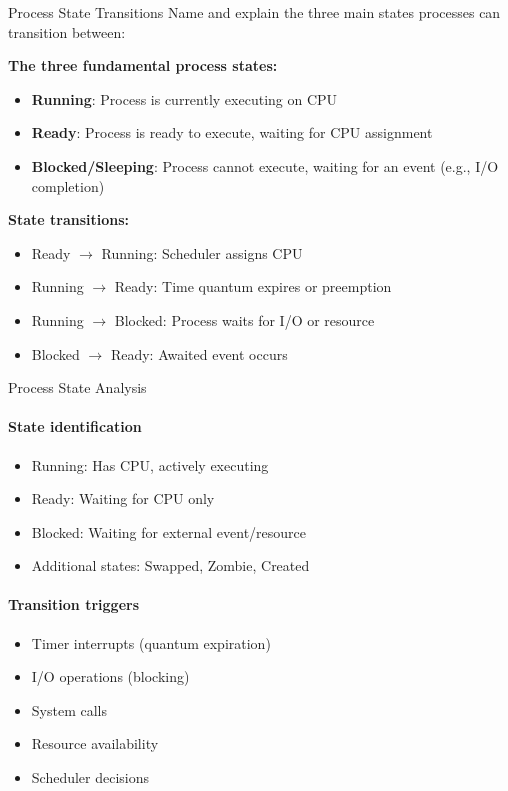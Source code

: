 \begin{example2}{Process State Transitions}
    Name and explain the three main states processes can transition between:
    
    \tcblower
    
    \textbf{The three fundamental process states:}
    \begin{itemize}
        \item \textbf{Running}: Process is currently executing on CPU
        \item \textbf{Ready}: Process is ready to execute, waiting for CPU assignment
        \item \textbf{Blocked/Sleeping}: Process cannot execute, waiting for an event (e.g., I/O completion)
    \end{itemize}
    
    \textbf{State transitions:}
    \begin{itemize}
        \item Ready $\rightarrow$ Running: Scheduler assigns CPU
        \item Running $\rightarrow$ Ready: Time quantum expires or preemption
        \item Running $\rightarrow$ Blocked: Process waits for I/O or resource
        \item Blocked $\rightarrow$ Ready: Awaited event occurs
    \end{itemize}
\end{example2}

\begin{KR}{Process State Analysis}
    \paragraph{State identification}
    \begin{itemize}
        \item Running: Has CPU, actively executing
        \item Ready: Waiting for CPU only
        \item Blocked: Waiting for external event/resource
        \item Additional states: Swapped, Zombie, Created
    \end{itemize}
    
    \paragraph{Transition triggers}
    \begin{itemize}
        \item Timer interrupts (quantum expiration)
        \item I/O operations (blocking)
        \item System calls
        \item Resource availability
        \item Scheduler decisions
    \end{itemize}
\end{KR}

